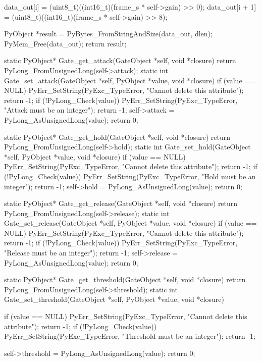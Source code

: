 \begin{pythoncode}
{{        data_out[i] = (uint8_t)((int16_t)(frame_s * self->gain) >> 0);
        data_out[i + 1] = (uint8_t)((int16_t)(frame_s * self->gain) >> 8);
    }

    PyObject *result = PyBytes_FromStringAndSize(data_out, dlen);
    PyMem_Free(data_out);
    return result;
}

static PyObject* Gate_get_attack(GateObject *self, void *closure) {
    return PyLong_FromUnsignedLong(self->attack);
}
static int Gate_set_attack(GateObject *self, PyObject *value, void *closure) {
    if (value == NULL) {
        PyErr_SetString(PyExc_TypeError, "Cannot delete this attribute");
        return -1;
    }
    if (!PyLong_Check(value)) {
        PyErr_SetString(PyExc_TypeError, "Attack must be an integer");
        return -1;
    }
    self->attack = PyLong_AsUnsignedLong(value);
    return 0;
}

static PyObject* Gate_get_hold(GateObject *self, void *closure) {
    return PyLong_FromUnsignedLong(self->hold);
}
static int Gate_set_hold(GateObject *self, PyObject *value, void *closure) {
    if (value == NULL) {
        PyErr_SetString(PyExc_TypeError, "Cannot delete this attribute");
        return -1;
    }
    if (!PyLong_Check(value)) {
        PyErr_SetString(PyExc_TypeError, "Hold must be an integer");
        return -1;
    }
    self->hold = PyLong_AsUnsignedLong(value);
    return 0;
}

static PyObject* Gate_get_release(GateObject *self, void *closure) {
    return PyLong_FromUnsignedLong(self->release);
}
static int Gate_set_release(GateObject *self, PyObject *value, void *closure) {
    if (value == NULL) {
        PyErr_SetString(PyExc_TypeError, "Cannot delete this attribute");
        return -1;
    }
    if (!PyLong_Check(value)) {
        PyErr_SetString(PyExc_TypeError, "Release must be an integer");
        return -1;
    }
    self->release = PyLong_AsUnsignedLong(value);
    return 0;
}

static PyObject* Gate_get_threshold(GateObject *self, void *closure) {
    return PyLong_FromUnsignedLong(self->threshold);
}
static int Gate_set_threshold(GateObject *self, PyObject *value, void *closure) {
    if (value == NULL) {
        PyErr_SetString(PyExc_TypeError, "Cannot delete this attribute");
        return -1;
    }
    if (!PyLong_Check(value)) {
        PyErr_SetString(PyExc_TypeError, "Threshold must be an integer");
        return -1;
    }

    self->threshold = PyLong_AsUnsignedLong(value);
    return 0;
}


\end{pythoncode}
